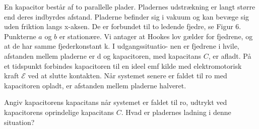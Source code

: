 \begin{exercise}[Opgave 6]
En kapacitor består af to parallelle plader. Pladernes udstrækning er
langt større end deres indbyrdes afstand. Pladerne befinder sig i vakuum og
kan bevæge sig uden friktion langs x-aksen. De er forbundet til to ledende
fjedre, se Figur 6. Punkterne $a$ og $b$ er stationære. Vi antager at Hookes lov
gælder for fjedrene, og at de har samme fjederkonstant k. I udgangssituatio-
nen er fjedrene i hvile, afstanden mellem pladerne er d og kapacitoren, med
kapacitans $C$, er afladt. På et tidspunkt forbindes kapacitoren til en ideel
emf kilde med elektromotorisk kraft $\mathcal{E} $ ved at slutte kontakten. Når systemet
senere er faldet til ro med kapacitoren opladt, er afstanden mellem pladerne
halveret.
\end{exercise}
\begin{figure}[ht]
    \centering
    \label{fig:opgave6}
\end{figure}
\begin{subexercise}[a]
Angiv kapacitorens kapacitans når systemet er faldet til ro, udtrykt ved
kapacitorens oprindelige kapacitans $C$. Hvad er pladernes ladning i denne
situation?
\end{subexercise}
\begin{solution}

\end{solution}

